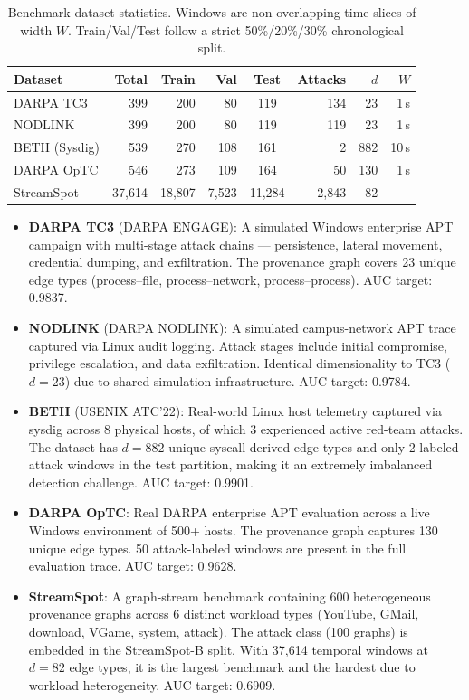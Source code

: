 \begin{table}[htbp]
\centering
\small
\caption{Benchmark dataset statistics. Windows are non-overlapping time slices of width $W$.
Train/Val/Test follow a strict 50\%/20\%/30\% chronological split.}
\begin{tabularx}{\linewidth}{Xrrrcrrr}
\toprule
\textbf{Dataset} & \textbf{Total} & \textbf{Train} & \textbf{Val} & \textbf{Test}
                 & \textbf{Attacks} & $d$ & $W$ \\
\midrule
DARPA TC3      & 399   & 200 & 80  & 119 & 134 & 23  & 1\,s \\
NODLINK        & 399   & 200 & 80  & 119 & 119 & 23  & 1\,s \\
BETH (Sysdig)  & 539   & 270 & 108 & 161 &   2 & 882 & 10\,s \\
DARPA OpTC     & 546   & 273 & 109 & 164 &  50 & 130 & 1\,s \\
StreamSpot     & 37{,}614 & 18{,}807 & 7{,}523 & 11{,}284 & 2{,}843 & 82 & --- \\
\bottomrule
\end{tabularx}
\label{tab:datasets}
\end{table}

\begin{itemize}
\item \textbf{DARPA TC3} (DARPA ENGAGE): A simulated Windows enterprise APT campaign with
  multi-stage attack chains --- persistence, lateral movement, credential dumping, and
  exfiltration. The provenance graph covers 23 unique edge types (process--file,
  process--network, process--process). AUC target: 0.9837.

\item \textbf{NODLINK} (DARPA NODLINK): A simulated campus-network APT trace captured via
  Linux audit logging. Attack stages include initial compromise, privilege escalation, and
  data exfiltration. Identical dimensionality to TC3 ($d = 23$) due to shared simulation
  infrastructure. AUC target: 0.9784.

\item \textbf{BETH} (USENIX ATC'22): Real-world Linux host telemetry captured via sysdig
  across 8 physical hosts, of which 3 experienced active red-team attacks. The dataset has
  $d = 882$ unique syscall-derived edge types and only 2 labeled attack windows in the test
  partition, making it an extremely imbalanced detection challenge. AUC target: 0.9901.

\item \textbf{DARPA OpTC}: Real DARPA enterprise APT evaluation across a live Windows
  environment of 500+ hosts. The provenance graph captures 130 unique edge types.
  50 attack-labeled windows are present in the full evaluation trace. AUC target: 0.9628.

\item \textbf{StreamSpot}: A graph-stream benchmark containing 600 heterogeneous provenance
  graphs across 6 distinct workload types (YouTube, GMail, download, VGame, system, attack).
  The attack class (100 graphs) is embedded in the StreamSpot-B split. With 37,614
  temporal windows at $d = 82$ edge types, it is the largest benchmark and the hardest due
  to workload heterogeneity. AUC target: 0.6909.
\end{itemize}


